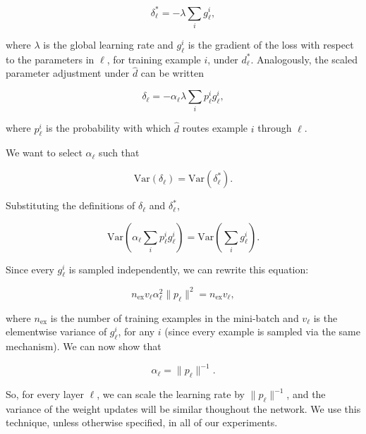 \documentclass{article}
\begin{document}
  \begin{equation}
    \delta_\ell^\ast = -\lambda \sum_i g_\ell^i,
  \end{equation}
  
  where $\lambda$ is the global learning rate and $g_\ell^i$ is the gradient of the loss with respect to the parameters in $\ell$, for training example $i$, under $d_\ell^\ast$. Analogously, the scaled parameter adjustment under $\hat{d}$ can be written

  \begin{equation}
    \delta_\ell = -\alpha_\ell \lambda \sum_i p_\ell^i g_\ell^i,
  \end{equation}
  
  where $p_\ell^i$ is the probability with which $\hat{d}$ routes example $i$ through $\ell$.
  
  We want to select $\alpha_\ell$ such that
  
  \begin{equation}
    \mathrm{Var}(\delta_\ell) =
    \mathrm{Var}(\delta_\ell^\ast).
  \end{equation}

  Substituting the definitions of $\delta_\ell$ and $\delta_\ell^\ast$,

  \begin{equation}
    \mathrm{Var} \left( \alpha_\ell \sum_i p_\ell^i g_\ell^i \right) =
    \mathrm{Var} \left( \sum_i g_\ell^i \right).
  \end{equation}
  
  Since every $g_\ell^i$ is sampled independently, we can rewrite this equation:
  
  \begin{equation}
    n_\text{ex} v_\ell \alpha_\ell^2 \|p_\ell\|^2 =
    n_\text{ex} v_\ell,
  \end{equation}

  where $n_\text{ex}$ is the number of training examples in the mini-batch and $v_\ell$ is the elementwise variance of $g_\ell^i$, for any $i$ (since every example is sampled via the same mechanism). We can now show that

  \begin{equation}
    \alpha_\ell = \|p_\ell\|^{-1}.
  \end{equation}

  So, for every layer $\ell$, we can scale the learning rate by $\|p_\ell\|^{-1}$, and the variance of the weight updates will be similar thoughout the network. We use this technique, unless otherwise specified, in all of our experiments.
  
\end{document}
